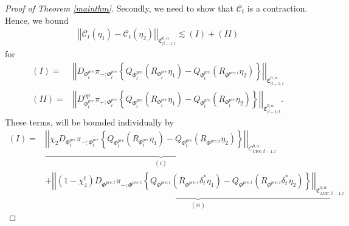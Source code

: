 \documentclass[psamsfonts]{amsart}
\theoremstyle{plain}
\theoremstyle{definition}{
\newtheorem{defi}{Definition}[section]
\newtheorem{ass}{Assumption}
\newtheorem*{nota}{Notation}}
\theoremstyle{remark}{
\newtheorem{rem}{Remark}
\newtheorem{ex}{Example}}
\theoremstyle{plain}{
\newtheorem{thm}{Theorem}[section]
\newtheorem{lem}{Lemma}[section]
\newtheorem{cor}{Corollary}[section]
\newtheorem{prop}{Proposition}[section]
\newtheorem{con}{Conjecture}[section]}
\newcommand{\m}[1]{{\mathrm{#1}}}
\begin{document}
\begin{proof}[Proof of Theorem \ref{mainthm}]
Secondly, we need to show that $\mathcal{C}_{t}$ is a contraction. Hence, we bound 
\begin{align*}
    \left|\left|\mathcal{C}_{t}(\eta_1)-\mathcal{C}_{t}(\eta_2)\right|\right|_{\mathfrak{C}^{0,\alpha}_{\beta-1;t}}\lesssim (I)+(II)
\end{align*}
for 
\begin{align*}
    (I)=&\left|\left|D_{\Phi^{pre}_{t}}\pi_{-;\Phi^{pre}_{t}}\left\{Q_{\Phi_{t}^{pre}}(R_{\Phi^{pre}_{t}}\eta_1)-Q_{\Phi_{t}^{pre}}(R_{\Phi^{pre;t}}\eta_2)\right\}\right|\right|_{\mathfrak{C}^{0,\alpha}_{\beta-1;t}}\\
    (II)=&\left|\left|D^{op}_{\Phi_{t}^{pre}}\pi_{+;\Phi^{pre}_{t}}\left\{Q_{\Phi_{t}^{pre}}(R_{\Phi^{pre}_{t}}\eta_1)-Q_{\Phi_{t}^{pre}}(R_{\Phi^{pre}_{t}}\eta_2)\right\}\right|\right|_{\mathfrak{C}^{0,\alpha}_{\beta-1;t}}.
\end{align*}
These terms, will be bounded individually  by
\begin{align*}
        (I)=&\underbrace{\left|\left|\chi_2D_{\Phi^{pre}_{t}}\pi_{-;\Phi^{pre}_{t}}\left\{Q_{\Phi_{t}^{pre}}(R_{\Phi^{pre}_{t}}\eta_1)-Q_{\Phi_{t}^{pre}}(R_{\Phi^{pre;t}}\eta_2)\right\}\right|\right|_{C^{0,\alpha}_{\m{CFS};\beta-1;t}}}_{(i)}\\
        &+\underbrace{\left|\left|(1-\chi^t_4)D_{\Phi^{pre;t}}\pi_{-;\Phi^{pre;t}}\left\{Q_{\Phi^{pre;t}}(R_{\Phi^{pre;t}}\delta_t^*\eta_1)-Q_{\Phi^{pre;t}}(R_{\Phi^{pre;t}}\delta_t^*\eta_2)\right\}\right|\right|_{\mathfrak{C}^{0,\alpha}_{\m{ACF};\beta-1;t}}}_{(ii)}
\end{align*}


\end{proof}
\end{document}
